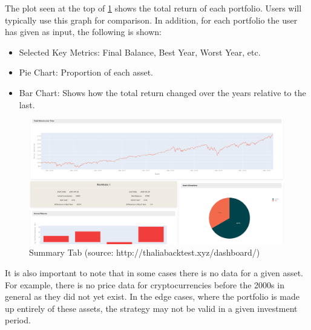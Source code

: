 \documentclass[main.tex]{subfiles}
\begin{document}
The plot seen at the top of \figurename{\ref{summary}} shows the total return of each portfolio. Users will typically use this graph for comparison. In addition, for each portfolio the user has given as input, the following is shown:

\begin{itemize}

    \item Selected Key Metrics: Final Balance, Best Year, Worst Year, etc.

    \item Pie Chart: Proportion of each asset.

    \item Bar Chart: Shows how the total return changed over the years relative to the last.

\end{itemize}



\begin{figure}[H]

   \centering

   \includegraphics[width=\textwidth]{08Appendices/081User/081Pictures/summary.png}

   \caption{Summary Tab (source: http://thaliabacktest.xyz/dashboard/)}

   \label{summary}

\end{figure}



It is also important to note that in some cases there is no data for a given asset. For example, there is no price data for cryptocurrencies before the 2000s in general as they did not yet exist. In the edge cases, where the portfolio is made up entirely of these assets, the strategy may not be valid in a given investment period. 
\end{document}
